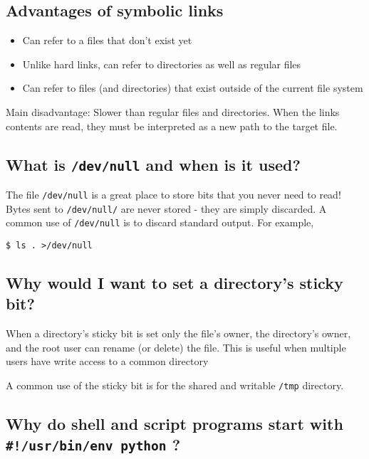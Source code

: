 \subsection{Advantages of symbolic
links}\label{advantages-of-symbolic-links}

\begin{itemize}
\itemsep1pt\parskip0pt
\item
  Can refer to a files that don't exist yet
\item
  Unlike hard links, can refer to directories as well as regular files
\item
  Can refer to files (and directories) that exist outside of the current
  file system
\end{itemize}

Main disadvantage: Slower than regular files and directories. When the
links contents are read, they must be interpreted as a new path to the
target file.

\subsection{\texorpdfstring{What is \texttt{/dev/null} and when is it
used?}{What is /dev/null and when is it used?}}\label{what-is-devnull-and-when-is-it-used}

The file \texttt{/dev/null} is a great place to store bits that you
never need to read!\\Bytes sent to \texttt{/dev/null/} are never stored
- they are simply discarded. A common use of \texttt{/dev/null} is to
discard standard output. For example,

\begin{verbatim}
$ ls . >/dev/null
\end{verbatim}

\subsection{Why would I want to set a directory's sticky
bit?}\label{why-would-i-want-to-set-a-directorys-sticky-bit}

When a directory's sticky bit is set only the file's owner, the
directory's owner, and the root user can rename (or delete) the file.
This is useful when multiple users have write access to a common
directory

A common use of the sticky bit is for the shared and writable
\texttt{/tmp} directory.

\subsection{\texorpdfstring{Why do shell and script programs start with
\texttt{\#!/usr/bin/env\ python}
?}{Why do shell and script programs start with \#!/usr/bin/env python ?}}\label{why-do-shell-and-script-programs-start-with-usrbinenv-python}

